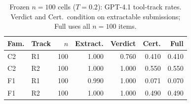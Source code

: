 \begin{table}[t]
  \centering
  \caption{Frozen $n{=}100$ cells ($T{=}0.2$): GPT-4.1 tool-track rates. Verdict and Cert.\ condition on extractable submissions; Full uses all $n{=}100$ items.}
  \label{tab:frontier-gpt-tools-n100-v1-summary}
  \setlength{\tabcolsep}{4pt}
  \begin{tabular}{@{}llrrrrr@{}}
    \toprule
    Fam. & Track & $n$ & Extract. & Verdict & Cert. & Full \\
    \midrule
    C2 & R1 & 100 & 1.000 & 0.760 & 0.410 & 0.410 \\
    C2 & R2 & 100 & 1.000 & 1.000 & 0.550 & 0.550 \\
    F1 & R1 & 100 & 0.990 & 1.000 & 0.071 & 0.070 \\
    F1 & R2 & 100 & 1.000 & 1.000 & 0.490 & 0.490 \\
    \bottomrule
  \end{tabular}
\end{table}
